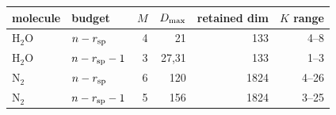 \begin{tabular}{llrrrr}
\hline
molecule & budget & $M$ & $D_{\max}$ & retained dim & $K$ range\\
\hline
$\mathrm{H_2O}$ & $n-r_{\mathrm{sp}}$ & 4 & 21 & 133 & 4--8\\
$\mathrm{H_2O}$ & $n-r_{\mathrm{sp}}-1$ & 3 & 27,31 & 133 & 1--3\\
$\mathrm{N_2}$ & $n-r_{\mathrm{sp}}$ & 6 & 120 & 1824 & 4--26\\
$\mathrm{N_2}$ & $n-r_{\mathrm{sp}}-1$ & 5 & 156 & 1824 & 3--25\\
\hline
\end{tabular}
